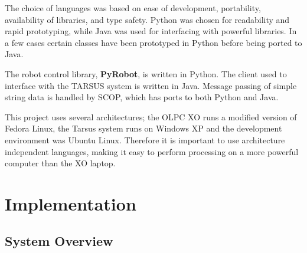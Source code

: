 \documentclass[12pt,a4,notitlepage]{report}
\renewcommand{\_}{\texttt{\symbol{95}}}
\newcommand{\<}{\texttt{\symbol{60}}}
\renewcommand{\>}{\texttt{\symbol{62}}}
\newcommand{\class}[1]{\textbf{#1}}
\begin{document}
The choice of languages was based on ease of development, portability, availability of libraries, and type safety. Python was chosen for readability and rapid prototyping, while Java was used for interfacing with powerful libraries. In a few cases certain classes have been prototyped in Python before being ported to Java.

The robot control library, \class{PyRobot}, is written in Python. The client used to interface with the TARSUS system is written in Java\cite{bodyPaint}. Message passing of simple string data is handled by SCOP, which has ports to both Python and Java.

This project uses several architectures; the OLPC XO runs a modified version of Fedora Linux, the Tarsus system runs on Windows XP and the development environment was Ubuntu Linux. Therefore it is important to use architecture independent languages, making it easy to perform processing on a more powerful computer than the XO laptop.

\chapter{Implementation}

\section{System Overview}
\end{document}
